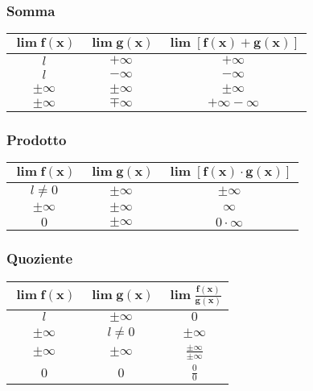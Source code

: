 \subsubsection{Somma}
\begin{center}
  \begin{tabular}{ccc}
    $\boldsymbol{\lim f(x)}$ & $\boldsymbol{\lim g(x)}$ & $\boldsymbol{\lim[f(x)+g(x)]}$\\\hline
    $l$ & $+\infty$ & $+\infty$\\
    $l$ & $-\infty$ & $-\infty$\\
    $\pm\infty$ & $\pm\infty$ & $\pm\infty$\\
    $\pm\infty$ & $\mp\infty$ & $\boxed{+\infty-\infty}$
  \end{tabular}
\end{center}

\subsubsection{Prodotto}
\begin{center}
  \begin{tabular}{ccc}
    $\boldsymbol{\lim f(x)}$ & $\boldsymbol{\lim g(x)}$ & $\boldsymbol{\lim[f(x)\cdot 
    g(x)]}$\\\hline
    $l\neq0$ & $\pm\infty$ & $\pm\infty$\\
    $\pm\infty$ & $\pm\infty$ & $\infty$\\
    $0$ & $\pm\infty$ & $\boxed{0\cdot\infty}$
  \end{tabular}
\end{center}

\subsubsection{Quoziente}
\begin{center}
  \begin{tabular}{ccc}
    $\boldsymbol{\lim f(x)}$ & $\boldsymbol{\lim g(x)}$ &
    $\boldsymbol{\lim\frac{f(x)}{g(x)}}$\\\hline
    $l$ & $\pm\infty$ & $0$\\
    $\pm\infty$ & $l\neq0$ & $\pm\infty$\\
    $\pm\infty$ & $\pm\infty$ & $\boxed{\frac{\pm\infty}{\pm\infty}}$\\
    $0$ & $0$ & $\boxed{\frac{0}{0}}$
  \end{tabular}
\end{center}

